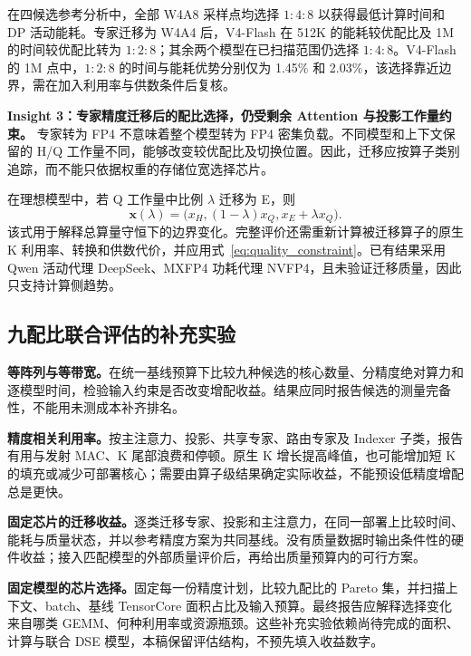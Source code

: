 在四候选参考分析中，全部 W4A8 采样点均选择 $1:4:8$ 以获得最低计算时间和 DP 活动能耗。专家迁移为 W4A4 后，V4-Flash 在 512K 的能耗较优配比及 1M 的时间较优配比转为 $1:2:8$；其余两个模型在已扫描范围仍选择 $1:4:8$。V4-Flash 的 1M 点中，$1:2:8$ 的时间与能耗优势分别仅为 1.45\% 和 2.03\%，该选择靠近边界，需在加入利用率与供数条件后复核。

\textbf{Insight 3：专家精度迁移后的配比选择，仍受剩余 Attention 与投影工作量约束。} 专家转为 FP4 不意味着整个模型转为 FP4 密集负载。不同模型和上下文保留的 H/Q 工作量不同，能够改变较优配比及切换位置。因此，迁移应按算子类别追踪，而不能只依据权重的存储位宽选择芯片。

在理想模型中，若 Q 工作量中比例 $\lambda$ 迁移为 E，则
\begin{equation}
\boldsymbol x(\lambda)=
\bigl(x_H,(1-\lambda)x_Q,x_E+\lambda x_Q\bigr).
\label{eq:precision_migration}
\end{equation}
该式用于解释总算量守恒下的边界变化。完整评价还需重新计算被迁移算子的原生 K 利用率、转换和供数代价，并应用式~\eqref{eq:quality_constraint}。已有结果采用 Qwen 活动代理 DeepSeek、MXFP4 功耗代理 NVFP4，且未验证迁移质量，因此只支持计算侧趋势。

\subsection{九配比联合评估的补充实验}
\label{sec:dse_next_evaluation}

\textbf{等阵列与等带宽。}在统一基线预算下比较九种候选的核心数量、分精度绝对算力和逐模型时间，检验输入约束是否改变增配收益。结果应同时报告候选的测量完备性，不能用未测成本补齐排名。

\textbf{精度相关利用率。}按主注意力、投影、共享专家、路由专家及 Indexer 子类，报告有用与发射 MAC、K 尾部浪费和停顿。原生 K 增长提高峰值，也可能增加短 K 的填充或减少可部署核心；需要由算子级结果确定实际收益，不能预设低精度增配总是更快。

\textbf{固定芯片的迁移收益。}逐类迁移专家、投影和主注意力，在同一部署上比较时间、能耗与质量状态，并以参考精度方案为共同基线。没有质量数据时输出条件性的硬件收益；接入匹配模型的外部质量评价后，再给出质量预算内的可行方案。

\textbf{固定模型的芯片选择。}固定每一份精度计划，比较九配比的 Pareto 集，并扫描上下文、batch、基线 TensorCore 面积占比及输入预算。最终报告应解释选择变化来自哪类 GEMM、何种利用率或资源瓶颈。这些补充实验依赖尚待完成的面积、计算与联合 DSE 模型，本稿保留评估结构，不预先填入收益数字。
